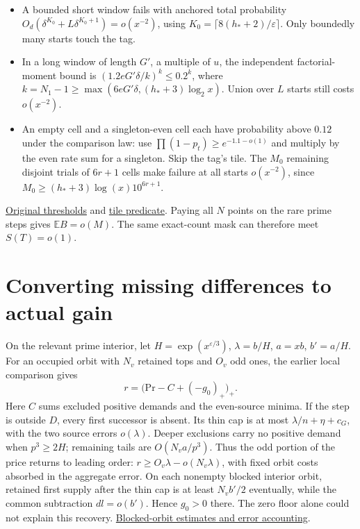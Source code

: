 \documentclass[12pt,letterpaper]{article}
\newcommand{\orig}[3]{\href{https://github.com/nousentllc/riemann-hypothesis/blob/40e56bab026552e089d7afcfeff08d2defb9c005/src/#1.lean\#L#2}{#3}}
\newcommand{\pagepart}[1]{\clearpage\section{#1}}
\begin{document}
\begin{itemize}\setlength\itemsep{1pt}
\item A bounded short window fails with anchored total probability \(O_d(\delta^{K_0}+L\delta^{K_0+1})=o(x^{-2})\), using \(K_0=\lceil8(h_*+2)/\varepsilon\rceil\). Only boundedly many starts touch the tag.
\item In a long window of length \(G'\), a multiple of \(u\), the independent factorial-moment bound is \((1.2eG'\delta/k)^k\le0.2^k\), where \(k=N_1-1\ge\max(6eG'\delta,(h_*+3)\log_2x)\). Union over \(L\) starts still costs \(o(x^{-2})\).
\item An empty cell and a singleton-even cell each have probability above \(0.12\) under the comparison law: use \(\prod(1-p_t)\ge e^{-1.1-o(1)}\) and multiply by the even rate sum for a singleton. Skip the tag's tile. The \(M_0\) remaining disjoint trials of \(6r+1\) cells make failure at all starts \(o(x^{-2})\), since \(M_0\ge(h_*+3)\log(x)10^{6r+1}\).
\end{itemize}
\orig{Formalism/SharpRestriction/GrowthBounds/UnramifiedQuadraticSetting}{237}{Original thresholds} and \orig{Formalism/SubspaceCounting/GoodOrbitIntervalTileCondition}{12}{tile predicate}. Paying all \(N\) points on the rare prime steps gives \(\mathbb EB=o(M)\). The same exact-count mask can therefore meet \(S(T)=o(1)\).

\pagepart{Converting missing differences to actual gain}
On the relevant prime interior, let \(H=\exp(x^{\varepsilon/3})\), \(\lambda=b/H\), \(a=xb\), \(b'=a/H\). For an occupied orbit with \(N_v\) retained tops and \(O_v\) odd ones, the earlier local comparison gives
\[
 r=\bigl(\mathrm{Pr}-C+(-g_0)_+\bigr)_+ .
\]
Here \(C\) sums excluded positive demands and the even-source minima. If the step is outside \(D\), every first successor is absent. Its thin cap is at most \(\lambda/n+\eta+c_G\), with the two source errors \(o(\lambda)\). Deeper exclusions carry no positive demand when \(p^3\ge2H\); remaining tails are \(O(N_v a/p^3)\). Thus the odd portion of the price returns to leading order: \(r\ge O_v\lambda-o(N_v\lambda)\), with fixed orbit costs absorbed in the aggregate error. On each nonempty blocked interior orbit, retained first supply after the thin cap is at least \(N_v b'/2\) eventually, while the common subtraction \(dl=o(b')\). Hence \(g_0>0\) there. The zero floor alone could not explain this recovery. \href{https://github.com/nousentllc/riemann-hypothesis/blob/a71afc29237a4b0ae379ff8be7d58310afb80d99/research/uriel/experiments/incumbent-recovery-study/evidence/rigidity/AUDIT.md}{Blocked-orbit estimates and error accounting}.
\end{document}
